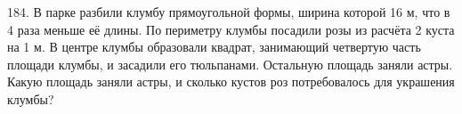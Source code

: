 184. В парке разбили клумбу прямоугольной формы, ширина которой 16 м, что в 4 раза меньше её длины. По периметру клумбы посадили розы из  расчёта 2 куста на 1 м. В центре клумбы образовали квадрат, занимающий четвертую часть площади клумбы, и засадили его тюльпанами. Остальную площадь заняли астры. Какую площадь заняли астры, и сколько кустов роз потребовалось для украшения клумбы?\\
